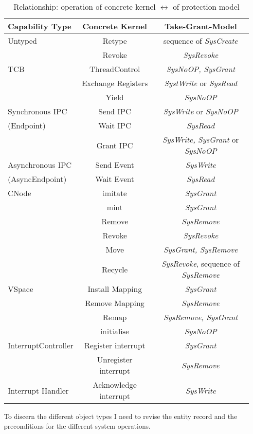 \begin{table}[H]
\begin{tabular}{|l|c|c|}
\hline
Capability Type & Concrete Kernel & Take-Grant-Model \\
\hline
\hline
Untyped & Retype & sequence of \textit{SysCreate} \\
& Revoke & \textit{SysRevoke} \\
\hline
TCB & ThreadControl & \textit{SysNoOP, SysGrant} \\
& Exchange Registers & \textit{SystWrite} or \textit{SysRead} \\
& Yield & \textit{SysNoOP} \\
\hline
Synchronous IPC & Send IPC & \textit{SysWrite} or \textit{SysNoOP} \\
(Endpoint) & Wait IPC & \textit{SysRead} \\
& Grant IPC & \textit{SysWrite, SysGrant} or \textit{SysNoOP} \\
\hline
Asynchronous IPC & Send Event & \textit{SysWrite} \\
(AsyncEndpoint) & Wait Event & \textit{SysRead} \\
\hline
CNode & imitate & \textit{SysGrant} \\
& mint & \textit{SysGrant} \\
& Remove & \textit{SysRemove} \\
& Revoke & \textit{SysRevoke} \\
& Move & \textit{SysGrant, SysRemove} \\
& Recycle & \textit{SysRevoke}, sequence of \textit{SysRemove} \\
\hline
VSpace & Install Mapping & \textit{SysGrant} \\
& Remove Mapping & \textit{SysRemove} \\
& Remap & \textit{SysRemove, SysGrant} \\
& initialise & \textit{SysNoOP} \\
\hline
InterruptController & Register interrupt & \textit{SysGrant} \\
& Unregister interrupt &  \textit{SysRemove}\\
\hline
Interrupt Handler & Acknowledge interrupt & \textit{SysWrite}\\
\hline
\end{tabular}
\caption{Relationship: operation of concrete kernel $\longleftrightarrow$ of protection model \cite{PhDseL4}} \end{table}
To discern the different object types I need to revise the entity record and the preconditions for the different system operations. \\ \\ 
